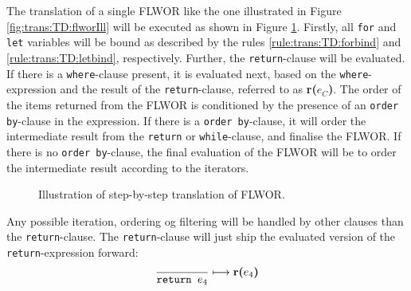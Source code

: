 The translation of a single FLWOR like the one illustrated in Figure \ref{fig:trans:TD:flworIll} will be executed
as shown in Figure \ref{fig:trans:TD:flworExecute}. Firstly, all \texttt{for} and \texttt{let} variables will be
bound as described by the rules \ref{rule:trans:TD:forbind} and \ref{rule:trans:TD:letbind}, respectively.
Further, the \texttt{return}-clause will be evaluated. If there is a \texttt{where}-clause present, it is
evaluated next, based on the \texttt{where}-expression and the result of the \texttt{return}-clause, referred to
as \textbf{r(}$e_{C}$\textbf{)}. The order of the items returned from the FLWOR is conditioned by the presence of
an \texttt{order by}-clause in the expression. If there is a \texttt{order by}-clause, it will order the
intermediate result from the \texttt{return} or \texttt{while}-clause, and finalise the FLWOR. If there is no
\texttt{order by}-clause, the final evaluation of the FLWOR will be to order the intermediate result according to
the iterators.

\begin{figure}[h]
\centering

\caption[FLWOR translation order]{Illustration of step-by-step translation of
FLWOR.\label{fig:trans:TD:flworExecute}}
\end{figure}



Any possible iteration, ordering og filtering will be handled by other clauses than the \texttt{return}-clause.
The \texttt{return}-clause will just ship the evaluated version of the \texttt{return}-expression forward:
\begin{equation}
\frac{}{\mbox{\texttt{return }}e_{4}}\longmapsto
\mbox{\textbf{r(}}e_{4}\mbox{\textbf{)}}
\label{rule:trans:TD:returnTaint}
\end{equation}


